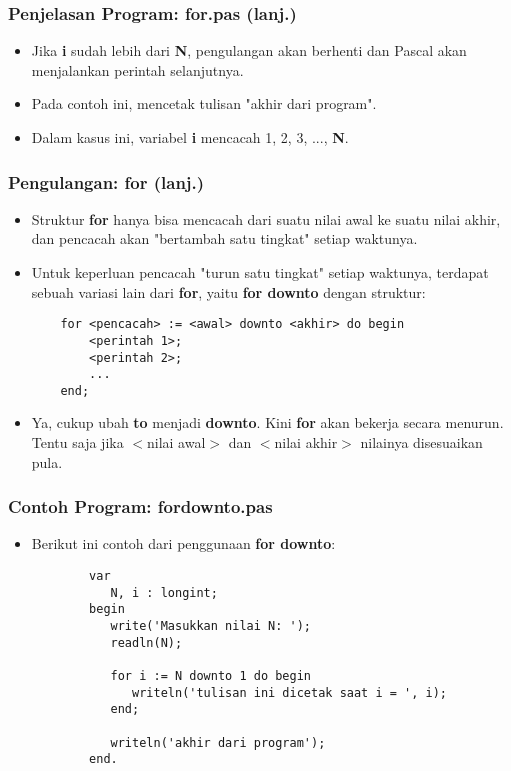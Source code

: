 \documentclass{beamer}
\begin{document}
\begin{frame}
\frametitle{Penjelasan Program: for.pas (lanj.)}
\begin{itemize}
	\item Jika \textbf{i} sudah lebih dari \textbf{N}, pengulangan akan berhenti dan Pascal akan menjalankan perintah selanjutnya.
	\item Pada contoh ini, mencetak tulisan "akhir dari program".
	\item Dalam kasus ini, variabel \textbf{i} mencacah 1, 2, 3, ..., \textbf{N}.
\end{itemize}
\end{frame}

\begin{frame}[fragile]
\frametitle{Pengulangan: for (lanj.)}
\begin{itemize}
	\item Struktur \textbf{for} hanya bisa mencacah dari suatu nilai awal ke suatu nilai akhir, dan pencacah akan "bertambah satu tingkat" setiap waktunya.
	\item Untuk keperluan pencacah "turun satu tingkat" setiap waktunya, terdapat sebuah variasi lain dari \textbf{for}, yaitu \textbf{for downto} dengan struktur:
	\begin{lstlisting}
	for <pencacah> := <awal> downto <akhir> do begin
	    <perintah 1>;
	    <perintah 2>;
	    ...
	end;
	\end{lstlisting}
	\item Ya, cukup ubah \alert{\textbf{to}} menjadi \alert{\textbf{downto}}. Kini \textbf{for} akan bekerja secara menurun. Tentu saja jika $<$nilai awal$>$ dan $<$nilai akhir$>$ nilainya disesuaikan pula.
\end{itemize}
\end{frame}

\begin{frame}[fragile]
\frametitle{Contoh Program: fordownto.pas}
\begin{itemize}
	\item Berikut ini contoh dari penggunaan \textbf{for downto}:
	\begin{lstlisting}
		var
		   N, i : longint;
		begin
		   write('Masukkan nilai N: ');
		   readln(N);
		
		   for i := N downto 1 do begin
		      writeln('tulisan ini dicetak saat i = ', i);
		   end;
		
		   writeln('akhir dari program');
		end.
	\end{lstlisting}
\end{itemize}
\end{frame}
\end{document}
